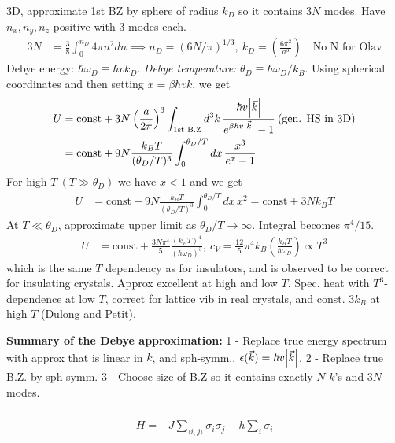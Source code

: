 \documentclass[a4paper, english, 12pt]{article}
\newcommand{\eps}{\epsilon}
\newcommand{\closed}[1]{\left( #1 \right)}
\begin{document}
\begin{multicols*}{2}
3D, approximate 1st BZ by sphere of radius $k_D$ so it contains $3N$ modes. Have $n_x,n_y,n_z$ positive with $3$ modes each. 
\begin{align*}
    3N&=\frac{3}{8}\int_0^{n_D} 4\pi n^2 dn \implies n_D = (6N/\pi)^{1/3},\: k_D = \closed{\frac{6\pi^2}{a^3}}\quad \text{No N for Olav}
\end{align*}
Debye energy: $\hbar \omega_D\equiv \hbar v k_D$. \textit{Debye temperature:} $\theta_D\equiv \hbar \omega_D/k_B$. Using spherical coordinates and then setting $x=\beta\hbar v k$, we get 
\begin{align*}
    U &= \text{const} + 3N\closed{\frac{a}{2\pi}}^3 \int_{\text{1st B.Z}} d^3 k\,\frac{\hbar v \abs{\vec{k}}}{e^{\beta\hbar v \abs{\vec{k}}} - 1}\:(\text{gen. HS in 3D}) \\ 
    &= \text{const} + 9N \frac{k_B T}{(\theta_D / T)^3} \int_0^{\theta_D / T} dx\, \frac{x^3}{e^x - 1}
\end{align*}
For high $T\:(T\gg\theta_D)$ we have $x<1$ and we get 
\begin{align*}
    U &= \text{const} + 9N \frac{k_B T}{(\theta_D / T)^3} \int_0^{\theta_D / T} dx\, x^2 = \text{const} + 3N k_B T
\end{align*}
At $T\ll\theta_D$, approximate upper limit as $\theta_D/T\to\infty$. Integral becomes $\pi^4/15$. 
\begin{align*}
    U &= \text{const} + \frac{3N\pi^4}{5} \frac{(k_B T)^4}{(\hbar\omega_D)^3},\: c_V = \frac{12}{5}\pi^4 k_B \closed{\frac{k_B T}{\hbar\omega_D}} \propto T^3 
\end{align*}
which is the same $T$ dependency as for insulators, and is observed to be correct for insulating crystals. Approx excellent at high and low $T$. Spec. heat with $T^3$-dependence at low $T$, correct for lattice vib in real crystals, and const. $3k_B$ at high $T$ (Dulong and Petit).

\textbf{Summary of the Debye approximation:} 1 - Replace true energy spectrum with approx that is linear in $k$, and sph-symm., $\eps(\vec{k})=\hbar v \abs{\vec{k}}$. 2 - Replace true B.Z. by sph-symm. 3 - Choose size of B.Z so it contains exactly $N$ $k$'s and $3N$ modes. 



\subsubsection*{}
\begin{align*}
    H = -J \sum_{\langle{i,j}\rangle} \sigma_i \sigma_j - h \sum_i \sigma_i 
\end{align*}


\end{multicols*}
\end{document}
